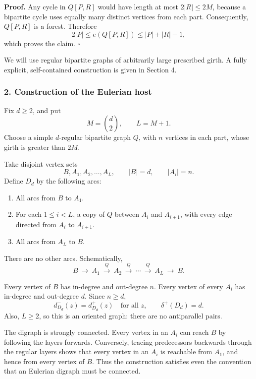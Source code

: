 \documentclass[
  11pt,
  a4paper,
]{article}
\providecommand{\tightlist}{%
  \setlength{\itemsep}{0pt}\setlength{\parskip}{0pt}}
\begin{document}
\textbf{Proof.} Any cycle in \(Q[P,R]\) would have length at most
\(2|R|\le 2M\), because a bipartite cycle uses equally many distinct
vertices from each part. Consequently, \(Q[P,R]\) is a forest. Therefore
\[
2|P|
\le e(Q[P,R])
\le |P|+|R|-1,
\] which proves the claim. \(\square\)

We will use regular bipartite graphs of arbitrarily large prescribed
girth. A fully explicit, self-contained construction is given in Section
4.

\subsubsection{2. Construction of the Eulerian
host}\label{construction-of-the-eulerian-host}

Fix \(d\ge 2\), and put \[
M=\binom d2,\qquad L=M+1.
\] Choose a simple \(d\)-regular bipartite graph \(Q\), with \(n\)
vertices in each part, whose girth is greater than \(2M\).

Take disjoint vertex sets \[
B,A_1,A_2,\ldots,A_L,
\qquad |B|=d,\qquad |A_i|=n.
\] Define \(D_d\) by the following arcs:

\begin{enumerate}
\def\labelenumi{\arabic{enumi}.}
\tightlist
\item
  All arcs from \(B\) to \(A_1\).
\item
  For each \(1\le i<L\), a copy of \(Q\) between \(A_i\) and
  \(A_{i+1}\), with every edge directed from \(A_i\) to \(A_{i+1}\).
\item
  All arcs from \(A_L\) to \(B\).
\end{enumerate}

There are no other arcs. Schematically, \[
B\ \longrightarrow\ A_1\ \overset{Q}{\longrightarrow}\ A_2\
\overset{Q}{\longrightarrow}\ \cdots\
\overset{Q}{\longrightarrow}\ A_L\ \longrightarrow\ B.
\]

Every vertex of \(B\) has in-degree and out-degree \(n\). Every vertex
of every \(A_i\) has in-degree and out-degree \(d\). Since \(n\ge d\),
\[
d^-_{D_d}(z)=d^+_{D_d}(z)\quad\text{for all }z,
\qquad
\delta^+(D_d)=d.
\] Also, \(L\ge2\), so this is an oriented graph: there are no
antiparallel pairs.

The digraph is strongly connected. Every vertex in an \(A_i\) can reach
\(B\) by following the layers forwards. Conversely, tracing predecessors
backwards through the regular layers shows that every vertex in an
\(A_i\) is reachable from \(A_1\), and hence from every vertex of \(B\).
Thus the construction satisfies even the convention that an Eulerian
digraph must be connected.
\end{document}
